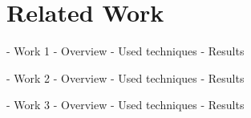 \chapter{Related Work}



- Work 1
    - Overview
    - Used techniques
    - Results

- Work 2
    - Overview
    - Used techniques
    - Results

- Work 3
    - Overview
    - Used techniques
    - Results
